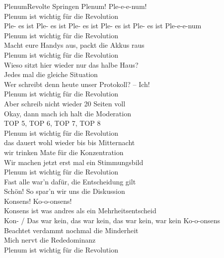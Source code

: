 
\begin{lied}{Plenum}{Revolte Springen}
Plenum! Ple-e-e-num! \\
Plenum ist wichtig für die Revolution\\
Ple- es ist Ple- es ist Ple- es ist Ple- es ist Ple- es ist Ple-e-e-num\\
Plenum ist wichtig für die Revolution\\
\vspace{1em}
Macht eure Handys aus, packt die Akkus raus\\
Plenum ist wichtig für die Revolution\\
Wieso sitzt hier wieder nur das halbe Haus?\\
Jedes mal die gleiche Situation\\
\vspace{1em}
Wer schreibt denn heute unser Protokoll? -- Ich!\\
Plenum ist wichtig für die Revolution\\
Aber schreib nicht wieder 20 Seiten voll\\
Okay, dann mach ich halt die Moderation\\
\vspace{1em}
TOP 5, TOP 6, TOP 7, TOP 8\\
Plenum ist wichtig für die Revolution\\
das dauert wohl wieder bis bis Mitternacht\\
wir trinken Mate für die Konzentration\\
\vspace{1em}
Wir machen jetzt erst mal ein Stimmungsbild\\
Plenum ist wichtig für die Revolution\\
Fast alle war'n dafür, die Entscheidung gilt\\
Schön! So spar'n wir uns die Diskussion\\
\vspace{1em}
Konsens! Ko-o-onsens!\\
Konsens ist was andres als ein Mehrheitsentscheid\\
Kon- / Das war kein, das war kein, das war kein, war kein Ko-o-onsens\\
Beachtet verdammt nochmal die Minderheit\\
\vspace{1em}
Mich nervt die Rededominanz\\
Plenum ist wichtig für die Revolution\\

\end{lied}
